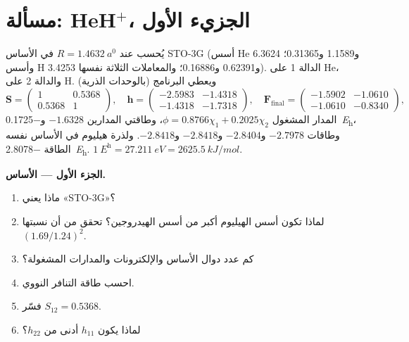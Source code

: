 \section{مسألة: HeH\texorpdfstring{$^+$}{+}، الجزيء الأول}

\begin{problem}
\label{pb:b3:computational-chemistry:1}
يُحسب  عند $R = \qty{1.4632}{\bohr}$ في الأساس STO-3G (أسس He
6.3624 و1.1589 و0.31365؛ وأسس H 3.4253 و0.62391 و0.16886؛ 
والمعاملات الثلاثة نفسها). الدالة 1 على He، والدالة 2 على H. ويعطي
البرنامج (بالوحدات الذرية)
\[
\mathbf S = \begin{pmatrix}1 & 0.5368\\ 0.5368 & 1\end{pmatrix},\quad
\mathbf h = \begin{pmatrix}-2.5983 & -1.4318\\ -1.4318 & -1.7318\end{pmatrix},\quad
\mathbf F_{\mathrm{final}} = \begin{pmatrix}-1.5902 & -1.0610\\ -1.0610 & -0.8340
\end{pmatrix},
\]
المدار المشغول $\phi = 0.8766\chi_1 + 0.2025\chi_2$، وطاقتي المدارين
$-1.6328$ و\qty{-0.1725}{\hartree}، وطاقات  $-2.7978$ و$-2.8404$
و$-2.8418$ و$-2.8418$. ولذرة هيليوم في الأساس نفسه الطاقة
\qty{-2.8078}{\hartree}. $\qty{1}{\hartree} = \qty{27.211}{eV} =
\qty{2625.5}{kJ/mol}$.

\medskip\noindent\textbf{الجزء الأول --- الأساس.}
\begin{enumerate}
  \item ماذا يعني «STO-3G»؟
  \item لماذا تكون أسس الهيليوم أكبر من أسس الهيدروجين؟ تحقق
        من أن نسبتها $(1.69/1.24)^2$.
  \item كم عدد دوال الأساس والإلكترونات والمدارات المشغولة؟
  \item احسب طاقة التنافر النووي.
  \item فسّر $S_{12} = 0.5368$.
  \item لماذا يكون $h_{11}$ أدنى من $h_{22}$؟
\end{enumerate}


\end{problem}

